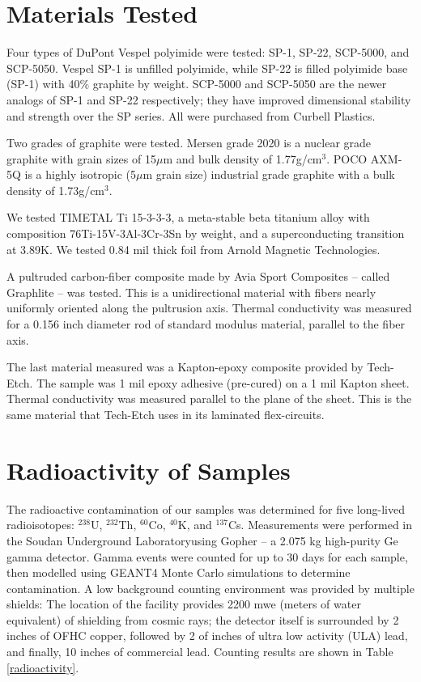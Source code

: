 \documentclass[final]{svjour2}
\begin{document}
\section{Materials Tested}
Four types of DuPont Vespel polyimide were tested: SP-1, SP-22, SCP-5000, and SCP-5050.  Vespel SP-1 is unfilled polyimide, while SP-22 is filled polyimide base (SP-1) with 40\% graphite by weight. SCP-5000 and SCP-5050 are the newer analogs of SP-1 and SP-22 respectively; they have improved dimensional stability and strength over the SP series. All were purchased from Curbell Plastics.

Two grades of graphite were tested. Mersen grade 2020 is a nuclear grade graphite with grain sizes of 15$\mu$m and bulk density of 1.77g/cm$^3$. POCO AXM-5Q is a highly isotropic (5$\mu$m grain size) industrial grade graphite with a bulk density of 1.73g/cm$^3$.

We tested TIMETAL Ti 15-3-3-3, a meta-stable beta titanium alloy with composition 76Ti-15V-3Al-3Cr-3Sn by weight, and a superconducting transition at 3.89K. We tested 0.84 mil thick foil from Arnold Magnetic Technologies.

A pultruded carbon-fiber composite made by Avia Sport Composites -- called Graphlite -- was tested. This is a unidirectional material with fibers nearly uniformly oriented along the pultrusion axis. Thermal conductivity was measured for a 0.156 inch diameter rod of standard modulus material, parallel to the fiber axis.

The last material measured was a Kapton-epoxy composite provided by Tech-Etch. The sample was 1 mil epoxy adhesive (pre-cured) on a 1 mil Kapton sheet. Thermal conductivity was measured parallel to the plane of the sheet. This is the same material that Tech-Etch uses in its laminated flex-circuits.

\section{Radioactivity of Samples}
The radioactive contamination of our samples was determined for five long-lived radioisotopes: $^{238}$U, $^{232}$Th, $^{60}$Co, $^{40}$K, and $^{137}$Cs. Measurements were performed in the Soudan Underground Laboratory\footnotemark using Gopher -- a 2.075 kg high-purity Ge gamma detector. Gamma events were counted for up to 30 days for each sample, then modelled using GEANT4 Monte Carlo simulations to determine contamination. A low background counting environment was provided by multiple shields: The location of the facility provides 2200 mwe (meters of water equivalent) of shielding from cosmic rays; the detector itself is surrounded by 2 inches of OFHC copper, followed by 2 of inches of ultra low activity (ULA) lead, and finally, 10 inches of commercial lead. Counting results are shown in Table \ref{radioactivity}.
\end{document}

